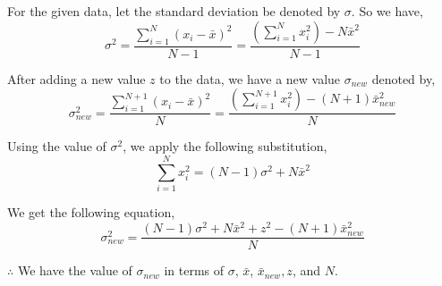 \documentclass[11pt]{article}
\begin{document}
\begin{enumerate}
{	For the given data, let the standard deviation be denoted by $\sigma$. So we have, \\
	$$\sigma^2 = \frac{\sum_{i=1}^{N}{(x_i-\bar{x})^2}}{N-1} = \frac{(\sum_{i=1}^{N}{x_i^2}) - N\bar{x}^2}{N-1}$$
	
	After adding a new value $z$ to the data, we have a new value $\sigma_{new}$ denoted by, \\
	$$ \sigma_{new}^2 = \frac{\sum_{i=1}^{N+1}{(x_i-\bar{x})^2}}{N} = \frac{(\sum_{i=1}^{N+1}{x_i^2}) - (N+1)\bar{x}_{new}^2}{N} $$
	
	Using the value of $\sigma^2$, we apply the following substitution, \\
	$$ \sum_{i=1}^{N}{x_i^2} = (N-1)\sigma^2 + N\bar{x}^2 $$

	We get the following equation, \\
	$$ \sigma_{new}^2  = \frac{(N-1)\sigma^2 + N\bar{x}^2 + z^2 - (N+1)\bar{x}_{new}^2}{N} $$

	$\therefore$ We have the value of $\sigma_{new}$ in terms of $\sigma$, $\bar{x}$, $\bar{x}_{new}, z$, and $N$. \\
	}
\end{enumerate}
\end{document}

